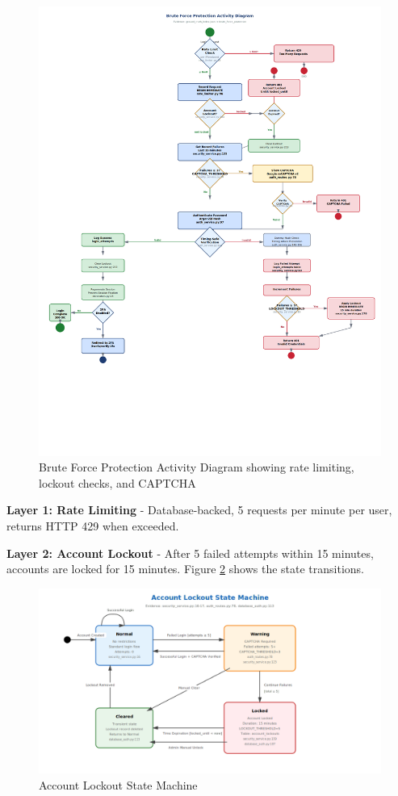 \documentclass[12pt,a4paper]{article}
\begin{document}
\begin{figure}[H]
    \centering
    \includegraphics[width=\textwidth,height=0.85\textheight,keepaspectratio]{diagrams/6_brute_force_activity.png}
    \caption{Brute Force Protection Activity Diagram showing rate limiting, lockout checks, and CAPTCHA}
    \label{fig:brute_force}
\end{figure}

\textbf{Layer 1: Rate Limiting} - Database-backed, 5 requests per minute per user, returns HTTP 429 when exceeded.

\textbf{Layer 2: Account Lockout} - After 5 failed attempts within 15 minutes, accounts are locked for 15 minutes. Figure \ref{fig:lockout_state} shows the state transitions.

\begin{figure}[H]
    \centering
    \includegraphics[width=\textwidth,keepaspectratio]{diagrams/13_account_lockout_state_machine.png}
    \caption{Account Lockout State Machine}
    \label{fig:lockout_state}
\end{figure}
\end{document}

